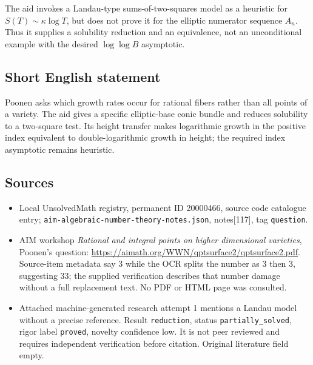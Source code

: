 \documentclass[11pt]{article}
\begin{document}
The aid invokes a Landau-type sums-of-two-squares model as a heuristic for $S(T)\sim\kappa\log T$, but does not prove it for the elliptic numerator sequence $A_n$. Thus it supplies a solubility reduction and an equivalence, not an unconditional example with the desired $\log\log B$ asymptotic.
\subsection{Short English statement}
Poonen asks which growth rates occur for rational fibers rather than all points of a variety. The aid gives a specific elliptic-base conic bundle and reduces solubility to a two-square test. Its height transfer makes logarithmic growth in the positive index equivalent to double-logarithmic growth in height; the required index asymptotic remains heuristic.
\subsection{Sources}
\begin{itemize}
\item Local UnsolvedMath registry, permanent ID 20000466, source code catalogue entry; \texttt{aim-algebraic-number-theory-notes.json}, notes[117], tag \texttt{question}.
\item AIM workshop \emph{Rational and integral points on higher dimensional varieties}, Poonen's question: \url{https://aimath.org/WWN/qptsurface2/qptsurface2.pdf}. Source-item metadata say 3 while the OCR splits the number as 3 then 3, suggesting 33; the supplied verification describes that number damage without a full replacement text. No PDF or HTML page was consulted.
\item Attached machine-generated research attempt 1 mentions a Landau model without a precise reference. Result \texttt{reduction}, status \texttt{partially\_solved}, rigor label \texttt{proved}, novelty confidence low. It is not peer reviewed and requires independent verification before citation. Original literature field empty.
\end{itemize}
\end{document}
